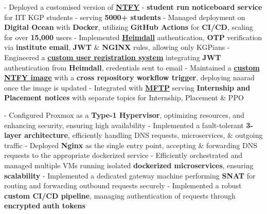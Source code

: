 \documentclass[a4paper,10pt]{extarticle} %
\begin{document}
\begin{description}[style=nextline, font=$\bullet$\hspace{2mm}\normalsize]
 \item[{\href{https://naarad.metakgp.org}{Naarad}} | Golang, Nginx, Digital Ocean, GitHub Actions, Docker ] 
- Deployed a customised version of \href{https://ntfy.sh/app}{\textbf{NTFY}} - \textbf{student run noticeboard service} for IIT KGP students - serving \textbf{5000+ students} \newline
- Managed deployment on \textbf{Digital Ocean} with \textbf{Docker}, utilizing \textbf{GitHub Actions} for \textbf{CI/CD}, scaling for over \textbf{15,000} users \newline
- Implemented \href{https://heimdall.metakgp.org}{\textbf{Heimdall}} authentication, \textbf{OTP} verification via \textbf{institute email}, \textbf{JWT} \& \textbf{NGINX} rules, allowing only KGPians \newline
- Engineered a \href{https://naarad-signup.metakgp.org}{\textbf{custom user registration system}} integrating \textbf{JWT} authentication from \textbf{Heimdall}, credentials sent to email \newline
- Maintained a \href{https://github.com/metakgp/naarad-ntfy}{\textbf{custom NTFY image}} with a \textbf{cross repository workflow trigger}, deploying naarad once the image is updated \newline
- Integrated with \href{https://github.com/metakgp/mftp}{\textbf{MFTP}} serving \textbf{Internship and Placement notices} with separate topics for Internship, Placement \& PPO

 \item[\href{https://github.com/tsg-iitkgp/ops-architecture}{On-Premise Server Setup \& Management} | Proxmox, Nginx, Docker ] 
- Configured Proxmox as a \textbf{Type-1 Hypervisor}, optimizing resources, and enhancing security, ensuring high availability \newline
- Implemented a fault-tolerant \textbf{3-layer architecture}, efficiently handling DNS requests, microservices, \& outgoing traffic \newline
- Deployed \textbf{Nginx} as the single entry point, accepting \& forwarding DNS requests to the appropriate dockerized service \newline
- Efficiently orchestrated and managed multiple VMs running isolated \textbf{dockerized microservices}, ensuring \textbf{scalability} \newline
- Implemented a dedicated gateway machine performing \textbf{SNAT} for routing and forwarding outbound requests securely \newline
- Implemented a robust \textbf{custom CI/CD pipeline}, managing authentication of requests through \textbf{encrypted auth tokens}


\end{description}
\end{document}
